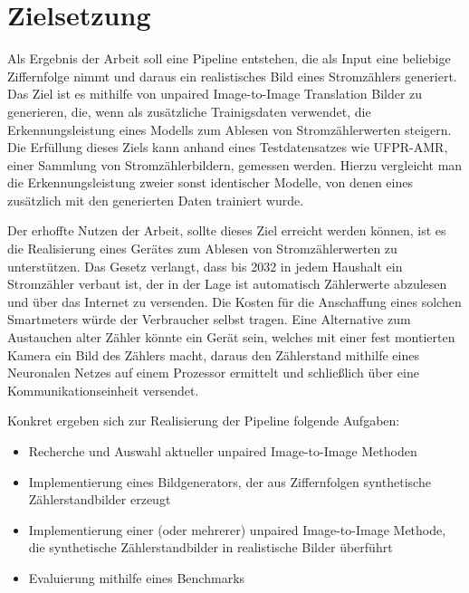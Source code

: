 \chapter*{Zielsetzung}
Als Ergebnis der Arbeit soll eine Pipeline entstehen,
die als Input eine beliebige Ziffernfolge nimmt und daraus ein realistisches Bild eines Stromzählers generiert.
Das Ziel ist es mithilfe von unpaired Image-to-Image Translation Bilder zu generieren, die, wenn als zusätzliche Trainigsdaten verwendet, die Erkennungsleistung eines Modells
 zum Ablesen von Stromzählerwerten steigern.
Die Erfüllung dieses Ziels kann anhand eines Testdatensatzes wie UFPR-AMR\cite{ufpr}, einer Sammlung von Stromzählerbildern, gemessen werden.
Hierzu vergleicht man die Erkennungsleistung zweier sonst identischer Modelle, von denen eines zusätzlich mit den generierten Daten trainiert wurde.

Der erhoffte Nutzen der Arbeit, sollte dieses Ziel erreicht werden können, ist es die Realisierung eines Gerätes zum Ablesen 
von Stromzählerwerten zu unterstützen. Das Gesetz verlangt, dass bis 2032 in jedem Haushalt ein Stromzähler verbaut ist, der
in der Lage ist automatisch Zählerwerte abzulesen und über das Internet zu versenden.\cite{bsi}
Die Kosten für die Anschaffung eines solchen Smartmeters würde der Verbraucher selbst tragen.
Eine Alternative zum Austauchen alter Zähler könnte ein Gerät sein, welches mit einer fest montierten Kamera ein Bild des
Zählers macht, daraus den Zählerstand mithilfe eines Neuronalen Netzes auf einem Prozessor ermittelt und schließlich über 
eine Kommunikationseinheit versendet.

Konkret ergeben sich zur Realisierung der Pipeline folgende Aufgaben:
\begin{itemize}
  \item Recherche und Auswahl aktueller unpaired Image-to-Image Methoden
  \item Implementierung eines Bildgenerators, der aus Ziffernfolgen synthetische Zählerstandbilder erzeugt
  \item Implementierung einer (oder mehrerer) unpaired Image-to-Image Methode, die synthetische Zählerstandbilder in realistische Bilder überführt
  \item Evaluierung mithilfe eines Benchmarks
\end{itemize}
